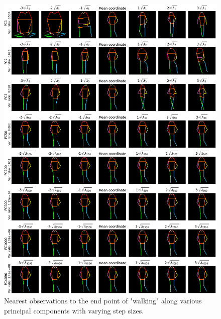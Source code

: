 \documentclass[./main.tex]{subfiles}
\begin{document}
\clearpage
\begin{figure}[htbp]
    \centering
    \includegraphics[width = \textwidth]{entities/shape_analysis.png}
    \caption{Nearest observations to the end point of "walking" along various principal components with varying step sizes.}
    \label{fig:shape_analysis}
\end{figure}
\end{document}
